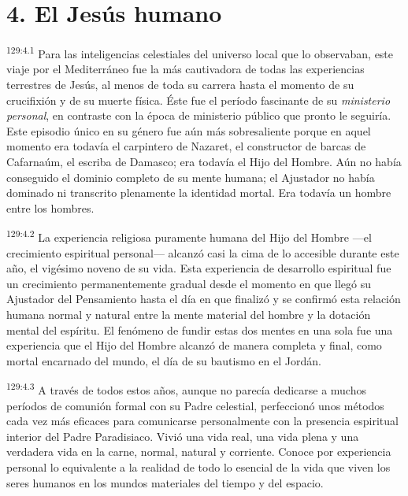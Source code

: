 \section*{4. El Jesús humano}
\par 
\textsuperscript{129:4.1} Para las inteligencias celestiales del universo local que lo observaban, este viaje por el Mediterráneo fue la más cautivadora de todas las experiencias terrestres de Jesús, al menos de toda su carrera hasta el momento de su crucifixión y de su muerte física. Éste fue el período fascinante de su \textit{ministerio personal}, en contraste con la época de ministerio público que pronto le seguiría. Este episodio único en su género fue aún más sobresaliente porque en aquel momento era todavía el carpintero de Nazaret, el constructor de barcas de Cafarnaúm, el escriba de Damasco; era todavía el Hijo del Hombre. Aún no había conseguido el dominio completo de su mente humana; el Ajustador no había dominado ni transcrito plenamente la identidad mortal. Era todavía un hombre entre los hombres.

\par 
\textsuperscript{129:4.2} La experiencia religiosa puramente humana del Hijo del Hombre ---el crecimiento espiritual personal--- alcanzó casi la cima de lo accesible durante este año, el vigésimo noveno de su vida. Esta experiencia de desarrollo espiritual fue un crecimiento permanentemente gradual desde el momento en que llegó su Ajustador del Pensamiento hasta el día en que finalizó y se confirmó esta relación humana normal y natural entre la mente material del hombre y la dotación mental del espíritu. El fenómeno de fundir estas dos mentes en una sola fue una experiencia que el Hijo del Hombre alcanzó de manera completa y final, como mortal encarnado del mundo, el día de su bautismo en el Jordán.

\par 
\textsuperscript{129:4.3} A través de todos estos años, aunque no parecía dedicarse a muchos períodos de comunión formal con su Padre celestial, perfeccionó unos métodos cada vez más eficaces para comunicarse personalmente con la presencia espiritual interior del Padre Paradisiaco. Vivió una vida real, una vida plena y una verdadera vida en la carne, normal, natural y corriente. Conoce por experiencia personal lo equivalente a la realidad de todo lo esencial de la vida que viven los seres humanos en los mundos materiales del tiempo y del espacio.

